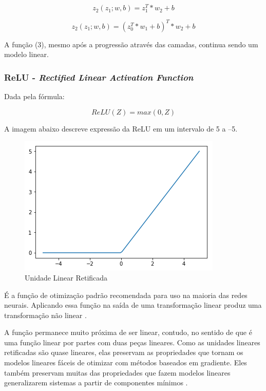 \documentclass[12pt]{article}
\begin{document}
\begin{equation}
    z_2(z_1; w, b) = z_1^T * w_2 + b
\end{equation}

\begin{equation}
    z_2(z_1; w, b) = (z_0^T * w_1 + b)^T * w_2 + b
\end{equation}

A função (3), mesmo após a progressão através das camadas, continua sendo um modelo linear.

\subsubsection{ReLU - \textit{Rectified Linear Activation Function}}

Dada pela fórmula:

\begin{equation}
    ReLU(Z) = max(0, Z)
\end{equation}

A imagem abaixo descreve expressão da ReLU em um intervalo de 5 a –5.

\begin{figure}[!htb]
\centering
\includegraphics[width=.5\textwidth]{images/relu.png}
\caption{Unidade Linear Retificada}
\label{fig:relu}
\end{figure}

É a função de otimização padrão recomendada para uso na maioria das redes neurais. Aplicando essa função na saída de uma transformação linear produz uma transformação não linear \cite{nair2010rectified}.

A função permanece muito próxima de ser linear, contudo, no sentido de que é uma função linear por partes com duas peças lineares. Como as unidades lineares retificadas são quase lineares, elas preservam as propriedades que tornam os modelos lineares fáceis de otimizar com métodos baseados em gradiente. Eles também preservam muitas das propriedades que fazem modelos lineares generalizarem sistemas a partir de componentes mínimos \cite{Goodfellow-et-al-2016}.
\end{document}
